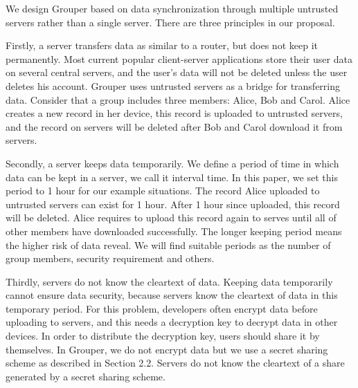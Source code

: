 \documentclass[twocolumn,10pt]{article}
\begin{document}
We design Grouper based on data synchronization through multiple untrusted servers rather than a single server. There are three principles in our proposal. 

Firstly, a server transfers data as similar to a router, but does not keep it permanently. Most current popular client-server applications store their user data on several central servers, and the user's data will not be deleted unless the user deletes his account. Grouper uses untrusted servers as a bridge for transferring data. Consider that a group includes three members: Alice, Bob and Carol. Alice creates a new record in her device, this record is uploaded to untrusted servers, and the record on servers will be deleted after Bob and Carol download it from servers.

Secondly, a server keeps data temporarily. We define a period of time in which data can be kept in a server, we call it interval time. In this paper, we set this period to 1 hour for our example situations. The record Alice uploaded to untrusted servers can exist for 1 hour. After 1 hour since uploaded, this record will be deleted. Alice requires to upload this record again to serves until all of other members have downloaded successfully. The longer keeping period means the higher risk of data reveal. We will find suitable periods as the number of group members, security requirement and others. 

Thirdly, servers do not know the cleartext of data. Keeping data temporarily cannot ensure data security, because servers know the cleartext of data in this temporary period. For this problem, developers often encrypt data before uploading to servers, and this needs a decryption key to decrypt data in other devices. In order to distribute the decryption key, users should share it by themselves. In Grouper, we do not encrypt data but we use a secret sharing scheme as described in Section 2.2. Servers do not know the cleartext of a share generated by a secret sharing scheme.
\end{document}
